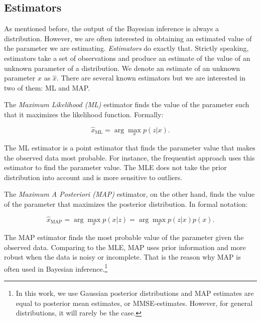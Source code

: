 \subsection{Estimators}\label{sec:estimators}

As mentioned before, the output of the Bayesian inference is always a
distribution. However, we are often interested in obtaining an estimated value
of the parameter we are estimating. \textit{Estimators} do exactly that.
Strictly speaking, estimators take a set of observations and produce an 
estimate of the value of an unknown parameter of a distribution. We denote an
estimate of an unknown parameter $x$ as $\hat{x}$. There are several known 
estimators but we are interested in two of them: ML and MAP.

The \textit{Maximum Likelihood (ML)} estimator finds the value of the parameter 
such that it maximizes the likelihood function. Formally:

$$
\hat{x}_{\mathrm{ML}} = \arg \max_x p(z|x).
$$

The ML estimator is a point estimator that finds the parameter value that 
makes the observed data most probable. For instance, the frequentist approach
uses this estimator to find the parameter value. The MLE does not take the 
prior distribution into account and is more sensitive to outliers. 

The \textit{Maximum A Posteriori (MAP)} estimator, on the other hand, finds the 
value of the parameter that maximizes the posterior distribution. In formal 
notation:

$$
\hat{x}_{\mathrm{MAP}} = \arg \max_x p(x|z) = \arg \max_x p(z|x)p(x).
$$

The MAP estimator finds the most probable value of the parameter given the 
observed data. Comparing to the MLE, MAP uses prior information and more robust
when the data is noisy or incomplete. That is the reason why MAP is often used
in Bayesian inference.\footnote{
    In this work, we use Gaussian posterior distributions and MAP estimates are 
    equal to posterior mean estimates, or MMSE-estimates. However, for general 
    distributions, it will rarely be the case.
}
